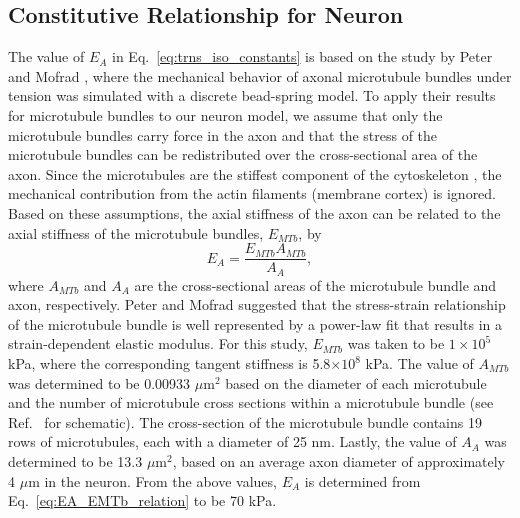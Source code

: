 \documentclass[]{interact}
\begin{document}
\subsection{Constitutive Relationship for Neuron}

The value of $E_A$ in Eq.\ \eqref{eq:trns_iso_constants} is based on the study by Peter and Mofrad \citep{Peter:2012fc}, where the mechanical behavior of axonal microtubule bundles under tension was simulated with a discrete bead-spring model. To apply their results for microtubule bundles to our neuron model, we assume that only the microtubule bundles carry force in the axon and that the stress of the microtubule bundles can be redistributed over the cross-sectional area of the axon. Since the microtubules are the stiffest component of the cytoskeleton \citep{Fletcher:2010ku}, the mechanical contribution from the actin filaments (membrane cortex) is ignored. Based on these assumptions, the axial stiffness of the axon can be related to the axial stiffness of the microtubule bundles, $E_{MTb}$, by
%
\begin{equation}
E_A = \frac{E_{MTb} A_{MTb}}{A_A},
\label{eq:EA_EMTb_relation}
\end{equation}
%
where $A_{MTb}$ and $A_A$ are the cross-sectional areas of the microtubule bundle and axon, respectively. Peter and Mofrad \citep{Peter:2012fc} suggested that the stress-strain relationship of the microtubule bundle is well represented by a power-law fit that results in a strain-dependent elastic modulus. For this study, $E_{MTb}$ was taken to be $1\times 10^5$ kPa, where the corresponding tangent stiffness is 5.8$\times 10^8$ kPa. The value of $A_{MTb}$ was determined to be 0.00933 $\mu$m${}^2$ based on the diameter of each microtubule and the number of microtubule cross sections within a microtubule bundle (see Ref.\ \citep{Peter:2012fc} for schematic). The cross-section of the microtubule bundle contains 19 rows of microtubules, each with a diameter of 25 nm. Lastly, the value of $A_A$ was determined to be 13.3 $\mu$m${}^2$, based on an average axon diameter of approximately 4 $\mu$m in the neuron. From the above values, $E_A$ is determined from Eq.\ \eqref{eq:EA_EMTb_relation} to be 70 kPa. 
\end{document}
